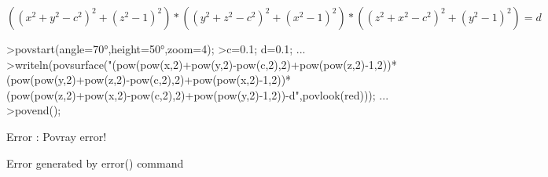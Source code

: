 \documentclass{article}
\begin{document}
\begin{eulernotebook}
\begin{eulercomment}
\begin{eulercomment}
\begin{eulercomment}
\begin{eulercomment}
\begin{eulercomment}
\begin{eulercomment}
\begin{eulercomment}
\begin{eulercomment}
\begin{eulercomment}
\begin{eulercomment}
\begin{eulercomment}
\begin{eulercomment}
\begin{eulercomment}
\begin{eulercomment}
\begin{eulercomment}
\begin{eulercomment}
\begin{eulercomment}
\begin{eulercomment}
\begin{eulercomment}
\begin{eulercomment}
\begin{eulercomment}
\begin{eulercomment}
\begin{eulercomment}
\begin{eulercomment}
\begin{eulercomment}
\begin{eulercomment}
\begin{eulercomment}
\end{eulercomment}
\begin{eulerformula}
\[
((x^2+y^2-c^2)^2+(z^2-1)^2)*((y^2+z^2-c^2)^2+(x^2-1)^2)*((z^2+x^2-c^2)^2+(y^2-1)^2)=d
\]
\end{eulerformula}
\begin{eulerprompt}
>povstart(angle=70°,height=50°,zoom=4);
>c=0.1; d=0.1; ...
>writeln(povsurface("(pow(pow(x,2)+pow(y,2)-pow(c,2),2)+pow(pow(z,2)-1,2))*(pow(pow(y,2)+pow(z,2)-pow(c,2),2)+pow(pow(x,2)-1,2))*(pow(pow(z,2)+pow(x,2)-pow(c,2),2)+pow(pow(y,2)-1,2))-d",povlook(red))); ...
>povend();
\end{eulerprompt}
\begin{euleroutput}
  Error : Povray error!
  
  Error generated by error() command
  

\end{euleroutput}
\end{eulercomment}
\end{eulercomment}
\end{eulercomment}
\end{eulercomment}
\end{eulercomment}
\end{eulercomment}
\end{eulercomment}
\end{eulercomment}
\end{eulercomment}
\end{eulercomment}
\end{eulercomment}
\end{eulercomment}
\end{eulercomment}
\end{eulercomment}
\end{eulercomment}
\end{eulercomment}
\end{eulercomment}
\end{eulercomment}
\end{eulercomment}
\end{eulercomment}
\end{eulercomment}
\end{eulercomment}
\end{eulercomment}
\end{eulercomment}
\end{eulercomment}
\end{eulercomment}
\end{eulernotebook}
\end{document}
